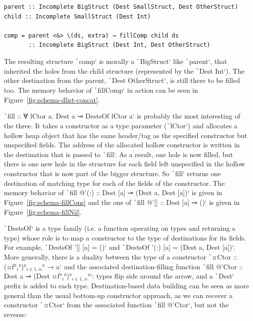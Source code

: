 \documentclass[english]{jflart}
\newlength{\currentparskip}
\newenvironment{unbreakable}
{%
  \setlength{\currentparskip}{\parskip}%
  \setlength{\parskip}{\currentparskip}%
  \par\vspace{0.5\baselineskip}%
  \noindent\begin{minipage}{\textwidth}%
    \setlength{\parskip}{\currentparskip}%
}
{%
  \end{minipage}%
  \par\vspace{0.5\baselineskip}%
}
\begin{document}
\begin{unbreakable}
{\small
\begin{verbatim}
parent :: Incomplete BigStruct (Dest SmallStruct, Dest OtherStruct)
child :: Incomplete SmallStruct (Dest Int)

comp = parent <&> \(ds, extra) → fillComp child ds
       :: Incomplete BigStruct (Dest Int, Dest OtherStruct)
\end{verbatim}
}
\end{unbreakable}

The resulting structure \texttt`comp` is morally a \texttt`BigStruct` like \texttt`parent`, that inherited the holes from the child structure (represented by the \texttt`Dest Int`). The other destination from the parent, \texttt`Dest OtherStruct`, is still there to be filled too. The memory behavior of \texttt`fillComp` in action can be seen in Figure~\ref{fig:schema-dlist-concat}.

\texttt`fill :: ∀ lCtor a. Dest a ⊸ DestsOf lCtor a` is probably the most interesting of the three. It takes a constructor as a type parameter (\texttt`lCtor`) and allocates a hollow heap object that has the same header/tag as the specified constructor but unspecified fields. The address of the allocated hollow constructor is written in the destination that is passed to \texttt`fill`. As a result, one hole is now filled, but there is one new hole in the structure for each field left unspecified in the hollow constructor that is now part of the bigger structure. So \texttt`fill` returns one destination of matching type for each of the fields of the constructor. The memory behavior of \texttt`fill @'(:) :: Dest [a] ⊸ (Dest a, Dest [a])` is given in Figure~\ref{fig:schema-fillCons} and the one of \texttt`fill @'[] :: Dest [a] ⊸ ()` is given in Figure~\ref{fig:schema-fillNil}.

\texttt`DestsOf` is a type family (i.e. a function operating on types and returning a type) whose role is to map a constructor to the type of destinations for its fields. For example, \texttt`DestsOf '[] [a] = ()` and \texttt`DestsOf '(:) [a] = (Dest a, Dest [a])`. More generally, there is a duality between the type of a constructor \texttt`¤Ctor :: (¤f°$_i$°)°$_{i \in 1..n}$° → a` and the associated destination-filling function \texttt`fill @'Ctor :: Dest a ⊸ (Dest ¤f°$_i$°)°$_{i \in 1..n}$°`: types flip side around the arrow, and a \texttt`Dest` prefix is added to each type. Destination-based data building can be seen as more general than the usual bottom-up constructor approach, as we can recover a constructor \texttt`¤Ctor` from the associated function \texttt`fill @'Ctor`, but not the reverse:
\end{document}
